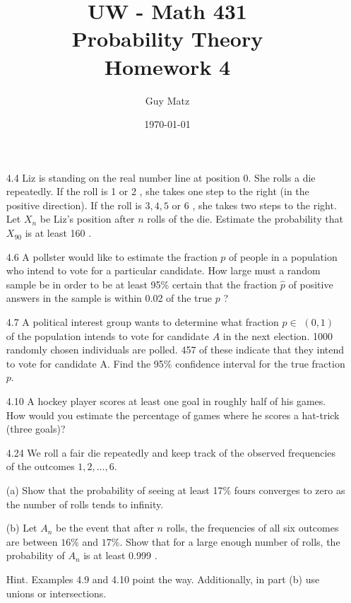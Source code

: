 \documentclass[10pt]{article}
\title{UW - Math 431 \\
Probability Theory \\
Homework 4}
\author{Guy Matz}
\date{\today}
\begin{document}
\maketitle

\begin{itemize}

  \item[4.4]  Liz is standing on the real number line at position 0. She rolls a die repeatedly. If the roll is 1 or 2 , she takes one step to the right (in the positive direction). If the roll is $3,4,5$ or 6 , she takes two steps to the right. Let $X_{n}$ be Liz's position after $n$ rolls of the die. Estimate the probability that $X_{90}$ is at least 160 .

\newpage
  \item[4.6]  A pollster would like to estimate the fraction $p$ of people in a population who intend to vote for a particular candidate. How large must a random sample be in order to be at least 95\% certain that the fraction $\hat{p}$ of positive answers in the sample is within 0.02 of the true $p$ ?

\newpage
  \item[4.7]  A political interest group wants to determine what fraction $p \in$ $(0,1)$ of the population intends to vote for candidate $A$ in the next election. 1000 randomly chosen individuals are polled. 457 of these indicate that they intend to vote for candidate A. Find the 95\% confidence interval for the true fraction $p$.

\newpage
  \item[4.10]  A hockey player scores at least one goal in roughly half of his games. How would you estimate the percentage of games where he scores a hat-trick (three goals)?

\newpage
  \item[4.24]  We roll a fair die repeatedly and keep track of the observed frequencies of the outcomes $1,2, \ldots, 6$.

(a) Show that the probability of seeing at least 17\% fours converges to zero as the number of rolls tends to infinity.

(b) Let $A_{n}$ be the event that after $n$ rolls, the frequencies of all six outcomes are between $16 \%$ and $17 \%$. Show that for a large enough number of rolls, the probability of $A_{n}$ is at least 0.999 .

Hint. Examples 4.9 and 4.10 point the way. Additionally, in part (b) use unions or intersections.


\end{itemize}
\end{document}
